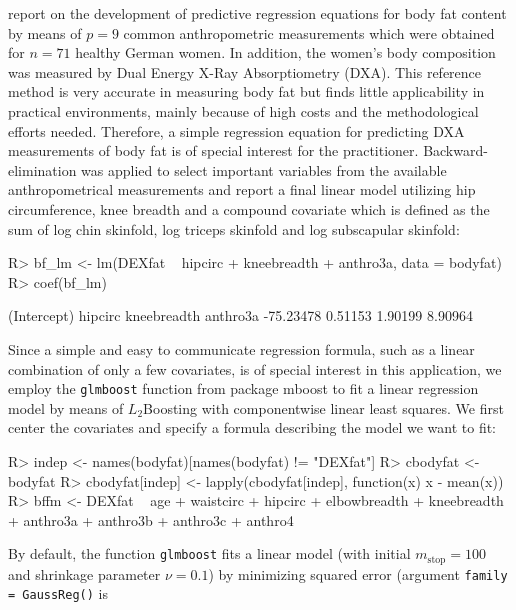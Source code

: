 \documentclass{article}
\newcommand{\Rpackage}[1]{{\normalfont\fontseries{b}\selectfont #1}}
\newcommand{\Rcmd}[1]{\texttt{#1}}
\newenvironment{Schunk}{}{}
\begin{document}
\citet{garcia2005} report on the development of predictive regression equations
for body fat content by means of $p = 9$ common anthropometric
measurements which were obtained for $n = 71$ healthy German women. 
In addition, the women's body composition was measured by 
Dual Energy X-Ray Absorptiometry (DXA). This reference method 
is very accurate in measuring body fat but finds little applicability
in practical environments, mainly because of high costs and the 
methodological efforts needed. Therefore, a simple regression equation 
for predicting DXA measurements of body fat is of special interest for the practitioner. 
Backward-elimination was applied to select
important variables from the available anthropometrical measurements and
\citet{garcia2005} report a final linear model utilizing
hip circumference, knee breadth and a compound covariate which is defined as
the sum of log chin skinfold, log triceps skinfold and log subscapular skinfold:
\begin{Schunk}
\begin{Sinput}
R> bf_lm <- lm(DEXfat ~ hipcirc + kneebreadth + anthro3a, 
         data = bodyfat)
R> coef(bf_lm)
\end{Sinput}
\begin{Soutput}
(Intercept)     hipcirc kneebreadth    anthro3a 
  -75.23478     0.51153     1.90199     8.90964 
\end{Soutput}
\end{Schunk}
Since a simple and easy to communicate regression formula, such as a 
linear combination of only a few covariates, is of special interest in this 
application, we employ the \Rcmd{glmboost} function from package 
\Rpackage{mboost}
to fit a linear regression model by means of $L_2$Boosting with componentwise
linear least squares. We first center the covariates
and specify a formula describing the model we want to fit:
\begin{Schunk}
\begin{Sinput}
R> indep <- names(bodyfat)[names(bodyfat) != "DEXfat"]
R> cbodyfat <- bodyfat
R> cbodyfat[indep] <- lapply(cbodyfat[indep], function(x) x - 
         mean(x))
R> bffm <- DEXfat ~ age + waistcirc + hipcirc + elbowbreadth + 
         kneebreadth + anthro3a + anthro3b + anthro3c + 
         anthro4
\end{Sinput}
\end{Schunk}
By default, the function \Rcmd{glmboost} fits a linear model (with 
initial $m_\text{stop} = 100$ and shrinkage parameter $\nu = 0.1$) by
minimizing squared error (argument \Rcmd{family = GaussReg()} is 
\end{document}

